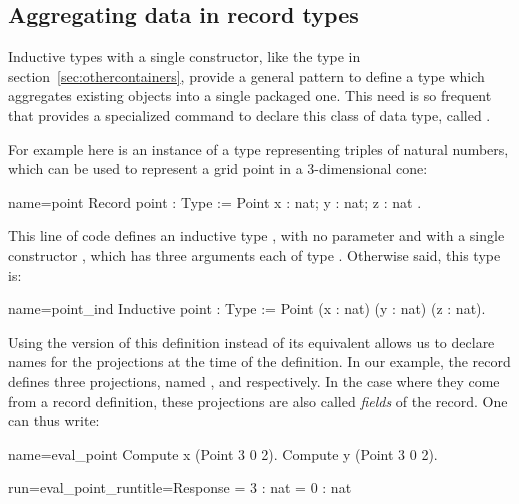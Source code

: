 \subsection{Aggregating data in record types}
\label{sec:records}

Inductive types with a single constructor, like the type  in
section~\ref{sec:othercontainers}, %
provide a general pattern to define a type
which aggregates existing objects into a single packaged one. This
need is so frequent that \Coq{} provides a specialized command
to declare this class of data type, called .

For example here is an instance of a type representing triples of
natural numbers, which can be used to represent a grid point in a
3-dimensional cone:

\begin{coq}{name=point}{}
Record point : Type := Point { x : nat; y : nat; z : nat }.
\end{coq}
This line of code defines an inductive type , with no
parameter and with a single constructor , which has three
arguments each of type . Otherwise said, this type is:

\begin{coq}{name=point_ind}{}
Inductive point : Type := Point (x : nat) (y : nat) (z : nat).
\end{coq}

Using the  version of this definition instead of its
equivalent  allows us to declare names for the projections
at the time of the definition. In our example, the record 
defines three projections, named ,  and 
respectively. In the case where they come from a record definition,
these projections are also called \emph{fields} of the record.
One can thus write:

\begin{coq-left}{name=eval_point}{}
Compute x (Point 3 0 2).
Compute y (Point 3 0 2).
\end{coq-left}{}{}
\begin{coqout-right}{run=eval_point_run}{title=Response}
= 3 : nat
= 0 : nat
\end{coqout-right}{}{}

